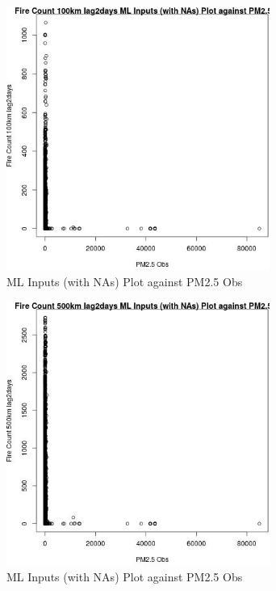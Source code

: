 \begin{figure} 
\centering  
\includegraphics[width=0.77\textwidth]{Code_Outputs/Report_ML_input_PM25_Step4_part_f_de_duplicated_aveswNAs_Fire_Count_100km_lag2daysvPM25_Obs.jpg} 
\caption{\label{fig:Report_ML_input_PM25_Step4_part_f_de_duplicated_aveswNAsFire_Count_100km_lag2daysvPM25_Obs}ML Inputs (with NAs) Plot against PM2.5 Obs} 
\end{figure} 
 

\begin{figure} 
\centering  
\includegraphics[width=0.77\textwidth]{Code_Outputs/Report_ML_input_PM25_Step4_part_f_de_duplicated_aveswNAs_Fire_Count_500km_lag2daysvPM25_Obs.jpg} 
\caption{\label{fig:Report_ML_input_PM25_Step4_part_f_de_duplicated_aveswNAsFire_Count_500km_lag2daysvPM25_Obs}ML Inputs (with NAs) Plot against PM2.5 Obs} 
\end{figure} 
 

